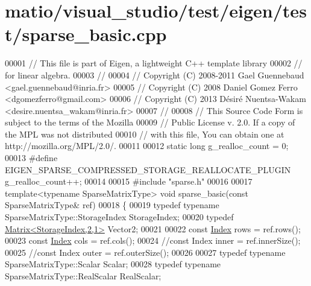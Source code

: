 \hypertarget{matio_2visual__studio_2test_2eigen_2test_2sparse__basic_8cpp_source}{}\section{matio/visual\+\_\+studio/test/eigen/test/sparse\+\_\+basic.cpp}
\label{matio_2visual__studio_2test_2eigen_2test_2sparse__basic_8cpp_source}

\begin{DoxyCode}
00001 \textcolor{comment}{// This file is part of Eigen, a lightweight C++ template library}
00002 \textcolor{comment}{// for linear algebra.}
00003 \textcolor{comment}{//}
00004 \textcolor{comment}{// Copyright (C) 2008-2011 Gael Guennebaud <gael.guennebaud@inria.fr>}
00005 \textcolor{comment}{// Copyright (C) 2008 Daniel Gomez Ferro <dgomezferro@gmail.com>}
00006 \textcolor{comment}{// Copyright (C) 2013 Désiré Nuentsa-Wakam <desire.nuentsa\_wakam@inria.fr>}
00007 \textcolor{comment}{//}
00008 \textcolor{comment}{// This Source Code Form is subject to the terms of the Mozilla}
00009 \textcolor{comment}{// Public License v. 2.0. If a copy of the MPL was not distributed}
00010 \textcolor{comment}{// with this file, You can obtain one at http://mozilla.org/MPL/2.0/.}
00011 
00012 \textcolor{keyword}{static} \textcolor{keywordtype}{long} g\_realloc\_count = 0;
00013 \textcolor{preprocessor}{#define EIGEN\_SPARSE\_COMPRESSED\_STORAGE\_REALLOCATE\_PLUGIN g\_realloc\_count++;}
00014 
00015 \textcolor{preprocessor}{#include "sparse.h"}
00016 
00017 \textcolor{keyword}{template}<\textcolor{keyword}{typename} SparseMatrixType> \textcolor{keywordtype}{void} sparse\_basic(\textcolor{keyword}{const} SparseMatrixType& ref)
00018 \{
00019   \textcolor{keyword}{typedef} \textcolor{keyword}{typename} SparseMatrixType::StorageIndex StorageIndex;
00020   \textcolor{keyword}{typedef} \hyperlink{group___core___module_class_eigen_1_1_matrix}{Matrix<StorageIndex,2,1>} Vector2;
00021   
00022   \textcolor{keyword}{const} \hyperlink{namespace_eigen_a62e77e0933482dafde8fe197d9a2cfde}{Index} rows = ref.rows();
00023   \textcolor{keyword}{const} \hyperlink{namespace_eigen_a62e77e0933482dafde8fe197d9a2cfde}{Index} cols = ref.cols();
00024   \textcolor{comment}{//const Index inner = ref.innerSize();}
00025   \textcolor{comment}{//const Index outer = ref.outerSize();}
00026 
00027   \textcolor{keyword}{typedef} \textcolor{keyword}{typename} SparseMatrixType::Scalar Scalar;
00028   \textcolor{keyword}{typedef} \textcolor{keyword}{typename} SparseMatrixType::RealScalar RealScalar;

\end{DoxyCode}
